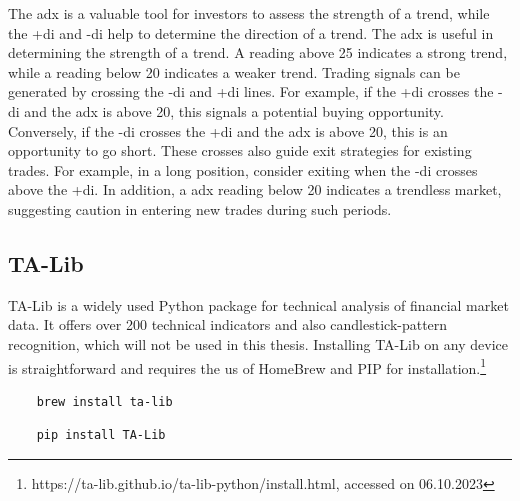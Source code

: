 \noindent
The \gls{adx} is a valuable tool for investors to assess the strength of a trend, while the \gls{+di} and \gls{-di} help to determine the direction of a trend.
\newline
\newline
The \gls{adx} is useful in determining the strength of a trend. A reading above 25 indicates a strong trend, while a reading below 20 indicates a weaker trend. Trading signals can be generated by crossing the \gls{-di} and \gls{+di} lines. For example, if the \gls{+di} crosses the \gls{-di} and the \gls{adx} is above 20, this signals a potential buying opportunity. Conversely, if the \gls{-di} crosses the \gls{+di} and the \gls{adx} is above 20, this is an opportunity to go short.
\newline
\newline
These crosses also guide exit strategies for existing trades. For example, in a long position, consider exiting when the \gls{-di} crosses above the \gls{+di}. In addition, a \gls{adx} reading below 20 indicates a trendless market, suggesting caution in entering new trades during such periods.

\subsection{TA-Lib}
\label{sub:TA-Lib}
TA-Lib is a widely used Python package for technical analysis of financial market data. It offers over 200 technical indicators and also candlestick-pattern recognition, which will not be used in this thesis. Installing TA-Lib on any device is straightforward and requires the us of HomeBrew and PIP for installation.\footnote{https://ta-lib.github.io/ta-lib-python/install.html, accessed on 06.10.2023}

\begin{verbatim}
    brew install ta-lib
\end{verbatim}

\begin{verbatim}
    pip install TA-Lib
\end{verbatim}